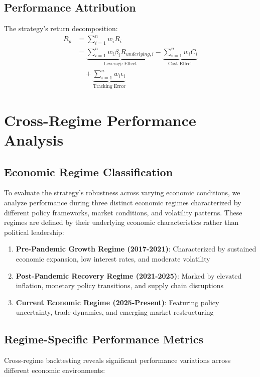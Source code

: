 \documentclass[onecolumn,ieee]{arithmaxresearch}
\begin{document}
\subsection{Performance Attribution}

The strategy's return decomposition:
\begin{align}
R_p &= \sum_{i=1}^n w_i R_i \\
&= \underbrace{\sum_{i=1}^n w_i \beta_i R_{underlying,i}}_{\text{Leverage Effect}} - \underbrace{\sum_{i=1}^n w_i C_i}_{\text{Cost Effect}} \\
&\quad + \underbrace{\sum_{i=1}^n w_i \epsilon_i}_{\text{Tracking Error}}
\end{align}

\section{Cross-Regime Performance Analysis}

\subsection{Economic Regime Classification}

To evaluate the strategy's robustness across varying economic conditions, we analyze performance during three distinct economic regimes characterized by different policy frameworks, market conditions, and volatility patterns. These regimes are defined by their underlying economic characteristics rather than political leadership:

\begin{enumerate}
    \item \textbf{Pre-Pandemic Growth Regime (2017-2021)}: Characterized by sustained economic expansion, low interest rates, and moderate volatility
    \item \textbf{Post-Pandemic Recovery Regime (2021-2025)}: Marked by elevated inflation, monetary policy transitions, and supply chain disruptions
    \item \textbf{Current Economic Regime (2025-Present)}: Featuring policy uncertainty, trade dynamics, and emerging market restructuring
\end{enumerate}

\subsection{Regime-Specific Performance Metrics}

Cross-regime backtesting reveals significant performance variations across different economic environments:
\end{document}
